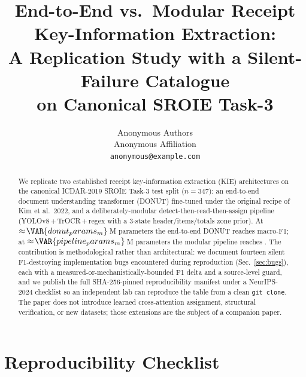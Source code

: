 \documentclass[conference]{IEEEtran}
\title{End-to-End vs.\ Modular Receipt Key-Information Extraction:\\
       A Replication Study with a Silent-Failure Catalogue\\
       on Canonical SROIE Task-3}
\author{Anonymous Authors\\Anonymous Affiliation\\
        \texttt{anonymous@example.com}}
\begin{document}
\maketitle

\begin{abstract}
We replicate two established receipt key-information extraction (KIE)
architectures on the canonical ICDAR-2019 SROIE Task-3 test split
($n=347$): an end-to-end document understanding transformer (DONUT)
fine-tuned under the original recipe of Kim et al.\ 2022, and a
deliberately-modular detect-then-read-then-assign pipeline
(YOLOv8\,+\,TrOCR\,+\,regex with a 3-state header/items/totals zone
prior).  At $\approx\!\VAR{donut_params_m}$\,M parameters the
end-to-end DONUT reaches  macro-F1; at
$\approx\!\VAR{pipeline_params_m}$\,M parameters the modular pipeline
reaches .  The contribution is methodological rather
than architectural: we document fourteen silent F1-destroying
implementation bugs encountered during reproduction
(Sec.~\ref{sec:bugs}), each with a measured-or-mechanistically-bounded
F1 delta and a source-level guard, and we publish the full
SHA-256-pinned reproducibility manifest under a NeurIPS-2024 checklist
so an independent lab can reproduce the table from a clean
\texttt{git clone}.  The paper does not introduce learned cross-attention
assignment, structural verification, or new datasets; those extensions
are the subject of a companion paper.
\end{abstract}
























\appendix





\section*{Reproducibility Checklist}
\label{sec:repro_checklist}

\end{document}
